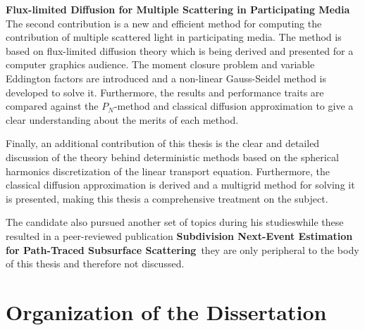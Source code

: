 \textbf{Flux-limited Diffusion for Multiple Scattering in Participating Media~\cite{Koerner14}} The second contribution is a new and efficient method for computing the contribution of multiple scattered light in participating media. The method is based on flux-limited diffusion theory which is being derived and presented for a computer graphics audience. The moment closure problem and variable Eddington factors are introduced and a non-linear Gauss-Seidel method is developed to solve it. Furthermore, the results and performance traits are compared against the $P_N$-method and classical diffusion approximation to give a clear understanding about the merits of each method.

Finally, an additional contribution of this thesis is the clear and detailed discussion of the theory behind deterministic methods based on the spherical harmonics discretization of the linear transport equation. Furthermore, the classical diffusion approximation is derived and a multigrid method for solving it is presented, making this thesis a comprehensive treatment on the subject.

The candidate also pursued another set of topics during his studies\mydash while these resulted in a peer-reviewed publication \textbf{Subdivision Next-Event Estimation for Path-Traced Subsurface Scattering}~\cite{Koerner16}\mydash they are only peripheral to the body of this thesis and therefore not discussed.

\section{Organization of the Dissertation}

